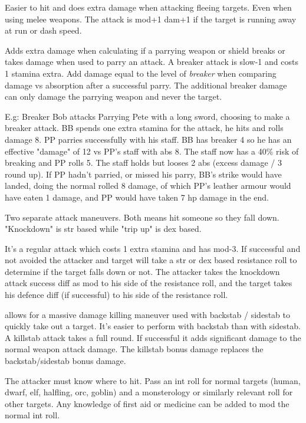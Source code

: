 Easier to hit and does extra damage when attacking fleeing targets. Even when using melee weapons. The attack is mod+1 dam+1 if the target is running away at run or dash speed.


 Adds extra damage when calculating if a parrying weapon or shield breaks or takes damage when used to parry an attack. A breaker attack is slow-1 and costs 1 stamina extra. Add damage equal to the level of \emph{breaker} when comparing damage vs absorption after a successful parry. The additional breaker damage can only damage the parrying weapon and never the target.

E.g: Breaker Bob attacks Parrying Pete with a long sword, choosing to make a breaker attack. BB spends one extra stamina for the attack, he hits and rolls damage 8. PP parries successfully with his staff. BB has breaker 4 so he has an effective "damage" of 12 vs PP's staff with abs 8. The staff now has a 40\% risk of breaking and PP rolls 5. The staff holds but looses 2 abs (excess damage / 3 round up). If PP hadn't parried, or missed his parry, BB's strike would have landed, doing the normal rolled 8 damage, of which PP's leather armour would have eaten 1 damage, and PP would have taken 7 hp damage in the end.


 Two separate attack maneuvers. Both means hit someone so they fall down. "Knockdown" is str based while "trip up" is dex based.

It's a regular attack which costs 1 extra stamina and has mod-3. If successful and not avoided the attacker and target will take a str or dex based resistance roll to determine if the target falls down or not. The attacker takes the knockdown attack success diff as mod to his side of the resistance roll, and the target takes his defence diff (if successful) to his side of the resistance roll.


 allows for a massive damage killing maneuver used with backstab / sidestab to quickly take out a target. It's easier to perform with backstab than with sidestab. A killstab attack takes a full round. If successful it adds significant damage to the normal weapon attack damage. The killstab bonus damage replaces the backstab/sidestab bonus damage.

The attacker must know where to hit. Pass an int roll for normal targets (human, dwarf, elf, halfling, orc, goblin) and a monsterology or similarly relevant roll for other targets. Any knowledge of first aid or medicine can be added to mod the normal int roll.

